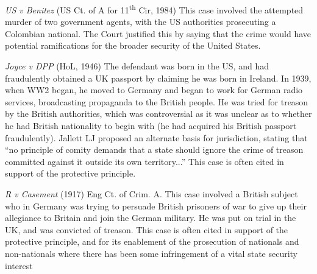 \begin{casedetails}{\textit{US v Benitez} (US Ct. of A for 11\textsuperscript{th} Cir, 1984)}
    \flushleft
    This case involved the attempted murder of two government agents, with the US authorities prosecuting a Colombian national. The Court justified this by saying that the crime would have potential ramifications for the broader security of the United States.
\end{casedetails}

\begin{casedetails}{\textit{Joyce v DPP} (HoL, 1946)}
    \flushleft
    The defendant was born in the US, and had fraudulently obtained a UK passport by claiming he was born in Ireland. In 1939, when WW2 began, he moved to Germany and began to work for German radio services, broadcasting propaganda to the British people. He was tried for treason by the British authorities, which was controversial as it was unclear as to whether he had British nationality to begin with (he had acquired his British passport fraudulently). Jallett LJ proposed an alternate basis for jurisdiction, stating that ``no principle of comity demands that a state should ignore the crime of treason committed against it outside its own territory...'' This case is often cited in support of the protective principle.
\end{casedetails}

\begin{casedetails}{\textit{R v Casement} (1917) Eng Ct. of Crim. A.}
    \flushleft
    This case involved a British subject who in Germany was trying to persuade British prisoners of war to give up their allegiance to Britain and join the German military. He was put on trial in the UK, and was convicted of treason. This case is often cited in support of the protective principle, and for its enablement of the prosecution of nationals and non-nationals where there has been some infringement of a vital state security interest
\end{casedetails}

